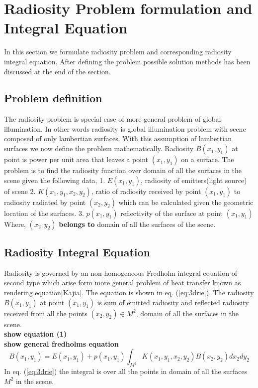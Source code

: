 
\chapter{Radiosity Problem formulation and Integral Equation}

In this section we formulate radiosity problem and corresponding radiosity integral equation. After defining the problem possible solution methods has been discussed at the end of the section.
\section{Problem definition}
The radiosity problem is special case of more general problem of global illumination. In other words radiosity is global illumination problem with scene composed of only lambertian surfaces. With this assumption of lambertian surfaces we now define the problem mathematically.
Radiosity $B(x_1,y_1)$ at point is power per unit area that leaves a point $(x_1,y_1)$ on a surface. The problem is to find the radiosity function over domain of all the surfaces in the scene given the following data,
1. $E(x_1,y_1)$, radiosity of emitters(light source) of scene
2. $K(x_1,y_1,x_2,y_2)$, ratio of radiosity received by point $(x_1,y_1)$ to radiosity radiated by point $(x_2,y_2)$  which can be calculated given the geometric location of the surfaces. 
3. $p(x_1,y_1)$ reflectivity of the surface at point $(x_1,y_1)$
Where, $(x_2,y_2)$  {\bf belongs to} domain of all the surfaces of the scene.
\section {Radiosity Integral Equation}
Radiosity is governed by an non-homogeneous Fredholm integral equation of second type which arise form more general problem of heat transfer known as rendering equation[Kajia]. The equation is shown in eq. (\ref{eq:3drie}). The radiosity $B(x_1,y_1)$ at point $(x_1,y_1)$  is sum of emitted radiosity and reflected radiosity received from all the points $(x_2,y_2) \in M^2$,  domain of all the surfaces in the scene.\\
{\bf show equation (1)}\\

{\bf show general fredholms equation}\\

\begin{equation} \label{eq:3drie}
B(x_1,y_1)=E(x_1,y_1)+p(x_1,y_1)\int_{M^2}K(x_1,y_1,x_2,y_2)B(x_2,y_2)dx_2dy_2
\end{equation}
In eq. (\ref{eq:3drie}) the integral is over all the points in domain of all  the surfaces $M^2$ in the scene. 


